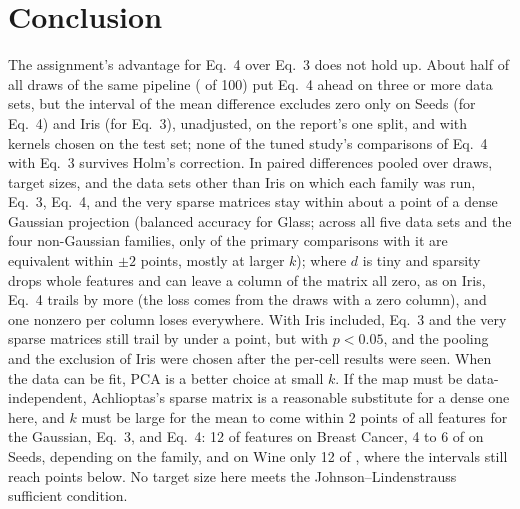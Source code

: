 \section{Conclusion}

The assignment's advantage for Eq.~4 over Eq.~3 does not hold up. About half of all draws of the same pipeline ( of 100) put Eq.~4 ahead on three or more data sets, but the interval of the mean difference excludes zero only on Seeds (for Eq.~4) and Iris (for Eq.~3), unadjusted, on the report's one split, and with kernels chosen on the test set; none of the tuned study's comparisons of Eq.~4 with Eq.~3 survives Holm's correction. In paired differences pooled over draws, target sizes, and the data sets other than Iris on which each family was run, Eq.~3, Eq.~4, and the very sparse matrices stay within about a point of a dense Gaussian projection (balanced accuracy for Glass; across all five data sets and the four non-Gaussian families, only  of the  primary comparisons with it are equivalent within $\pm 2$ points, mostly at larger $k$); where $d$ is tiny and sparsity drops whole features and can leave a column of the matrix all zero, as on Iris, Eq.~4 trails by more (the loss comes from the draws with a zero column), and one nonzero per column loses everywhere. With Iris included, Eq.~3 and the very sparse matrices still trail by under a point, but with $p < 0.05$, and the pooling and the exclusion of Iris were chosen after the per-cell results were seen. When the data can be fit, PCA is a better choice at small $k$. If the map must be data-independent, Achlioptas's sparse matrix is a reasonable substitute for a dense one here, and $k$ must be large for the mean to come within 2 points of all features for the Gaussian, Eq.~3, and Eq.~4: 12 of  features on Breast Cancer, 4 to 6 of  on Seeds, depending on the family, and on Wine only 12 of , where the intervals still reach  points below. No target size here meets the Johnson--Lindenstrauss sufficient condition.
